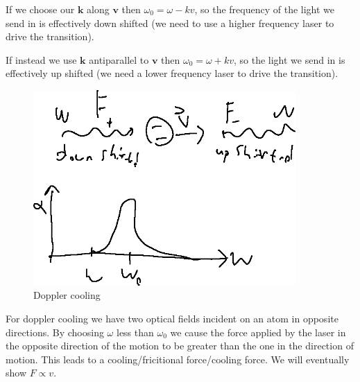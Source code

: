 If we choose our $\bm{k}$ along $\bm{v}$ then $\omega_0 = \omega - kv$, so the frequency of the light we send in is effectively down shifted (we need to use a higher frequency laser to drive the transition).

If instead we use $\bm{k}$ antiparallel to $\bm{v}$ then $\omega_0 = \omega + kv$, so the light we send in is effectively up shifted (we need a lower frequency laser to drive the transition).

\begin{figure}[h!]
	\centering
	\includegraphics[width=10cm]{images/11-26-6.png}
	\caption*{Doppler cooling}
\end{figure}
For doppler cooling we have two optical fields incident on an atom in opposite directions. By choosing $\omega$ less than $\omega_0$ we cause the force applied by the laser in the opposite direction of the motion to be greater than the one in the direction of motion.
This leads to a cooling/fricitional force/cooling force. We will eventually show $F\propto v$.
